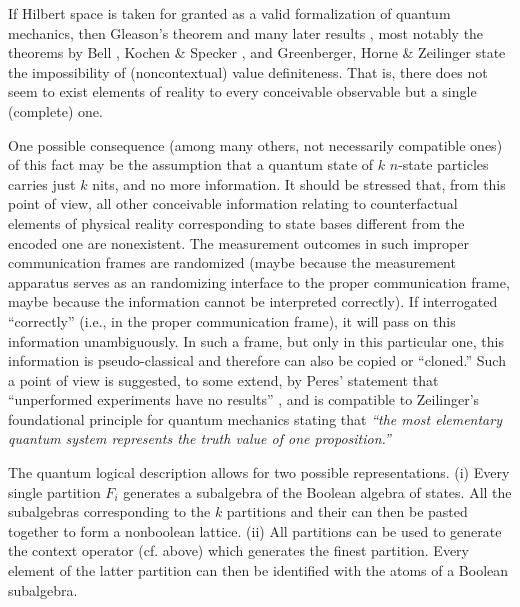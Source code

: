 
If Hilbert space is taken for granted as a valid formalization of quantum mechanics,
then Gleason's theorem \cite{Gleason} and many later results
\cite{kamber64,kamber65,ZirlSchl-65,CalHerSvo}, most notably the theorems by
Bell \cite{bell,mermin-93},
Kochen \& Specker \cite{kochen1},
and Greenberger, Horne \& Zeilinger  \cite{ghsz}
state the impossibility of (noncontextual) value definiteness.
That is, there does not seem to exist elements of reality to every conceivable
observable but a single (complete) one.

One possible consequence (among many others, not necessarily compatible ones)
of this fact may be the assumption that a quantum state of $k$ $n$-state particles
carries just
$k$ nits, and no more information.
It should be stressed that,
from this point of view,
all other conceivable information relating to counterfactual elements
of physical reality
corresponding to state bases different
from the encoded one are nonexistent.
The measurement outcomes in such improper communication frames
are randomized (maybe because the measurement apparatus
serves as an randomizing interface to the proper communication frame,
maybe because the information cannot be interpreted correctly).
If interrogated ``correctly'' (i.e., in the proper communication frame),
it will pass on this information unambiguously.
In such a frame, but only in this particular one,
this information is pseudo-classical and therefore can
also be copied or ``cloned.''
Such a point of view is suggested, to some extend, by Peres' statement
that ``unperformed experiments have no results'' \cite{peres222},
and is compatible to Zeilinger's foundational principle for quantum mechanics
\cite{zeil-99} stating that {\em ``the most elementary quantum system represents the truth value
of one proposition.''}


The quantum logical description allows for two possible representations.
(i) Every single partition
$F_i$ generates a subalgebra of the Boolean algebra of states.
All the subalgebras corresponding to the $k$ partitions and their
can then be pasted together to form a nonboolean lattice.
(ii) All partitions can be used to generate the context operator (cf. above) which
generates the finest partition. Every element of the
latter partition can then be identified with the atoms of a Boolean subalgebra.

